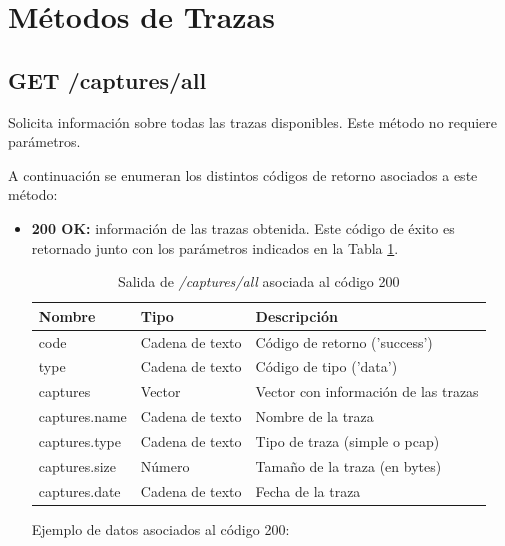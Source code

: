 \section{Métodos de Trazas \label{extra:api:trazas}}

%
%
\subsection{GET /captures/all}
Solicita información sobre todas las \glspl{traza} disponibles. Este método no requiere parámetros.

A continuación se enumeran los distintos códigos de retorno asociados a este método:
\begin{itemize}

\item{\textbf{200 OK:} información de las \glspl{traza} obtenida. Este código de éxito es retornado junto con los parámetros indicados en la Tabla \ref{extra:api:capturesall:ok}.
\begin{table}[H]
\centering
\begin{tabular}{|l|l|l|}
\hline
\rowcolor[HTML]{F5F5F5}
\textbf{Nombre}                & \textbf{Tipo}   & \textbf{Descripción}                            \\ \hline
code                           & Cadena de texto & Código de retorno ('success')                   \\ \hline
type                           & Cadena de texto & Código de tipo ('data')                         \\ \hline
captures                       & Vector          & Vector con información de las \glspl{traza}     \\ \hline
captures.name                  & Cadena de texto & Nombre de la \gls{traza}                        \\ \hline
captures.type                  & Cadena de texto & Tipo de \gls{traza} (\gls{simple} o \gls{pcap}) \\ \hline
captures.size                  & Número          & Tamaño de la \gls{traza} (en bytes)             \\ \hline
captures.date                  & Cadena de texto & Fecha de la \gls{traza}                         \\ \hline
\end{tabular}
\caption{Salida de \textit{/captures/all} asociada al código 200}
\label{extra:api:capturesall:ok}
\end{table}
\begin{minipage}{\textwidth}
Ejemplo de datos asociados al código 200:


\end{minipage}}
\end{itemize}
